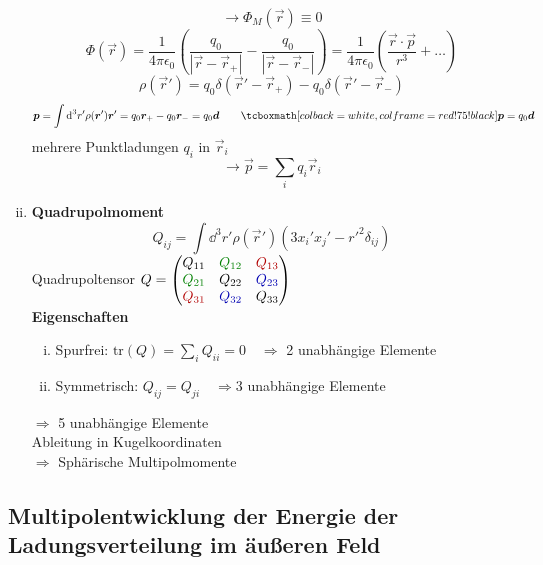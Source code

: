 \begin{enumerate}[i)]
\begin{minipage}{.5\linewidth}
\begin{tikzpicture}
		\end{tikzpicture}
	\end{minipage}%
	\[\rightarrow\Phi_M(\vec{r})\equiv0\]
	\[\Phi(\vec{r})=\frac{1}{4\pi\epsilon_0}\left(\frac{q_0}{|\vec{r}-\vec{r}_+|}-\frac{q_0}{|\vec{r}-\vec{r}_-|}\right)=\frac{1}{4\pi\epsilon_0}\left(\frac{\vec{r}\cdot\vec{p}}{r^3}+\ldots\right)\]
	\[\rho(\vec{r}')=q_0\delta(\vec{r}'-\vec{r}_+)-q_0\delta(\vec{r}'-\vec{r}_-)\]
	\[\vec{p}=\int\dd^3r'\rho(\vec{r}')\vec{r}'=q_0\vec{r}_+-q_0\vec{r}_-=q_0\vec{d} \qquad \rmbox{\vec{p} = q_0 \vec{d}}\]
	mehrere Punktladungen $q_i$ in $\vec{r}_i$\\
	\[\rightarrow\vec{p}=\sum_iq_i\vec{r}_i\]
	\item \textbf{Quadrupolmoment}
	\[Q_{ij}=\int\dd^3r'\rho(\vec{r}')(3x_i'x_j'-r'^2\delta_{ij})\]
	Quadrupoltensor $Q=\begin{pmatrix}Q_{11}& \color{black!50!green} Q_{12}& \color{black!30!red} Q_{13}\\\color{black!50!green} Q_{21} &Q_{22}& \color{black!30!blue} Q_{23}\\\color{black!30!red} Q_{31} & \color{black!30!blue} Q_{32} & Q_{33}\end{pmatrix}$\\ 
	\textbf{Eigenschaften}
	\begin{enumerate}[i)]
		\item Spurfrei: $\mathrm{tr}(Q)=\sum_iQ_{ii}=0 \quad \Rightarrow $ 2 unabhängige Elemente
		\item Symmetrisch: $Q_{ij}=Q_{ji} \quad \Rightarrow 3 $ unabhängige Elemente
	\end{enumerate}
	$\Rightarrow$ 5 unabhängige Elemente\\[5pt]
	
	Ableitung in Kugelkoordinaten\\
	$\Rightarrow$ Sphärische Multipolmomente
\end{enumerate}

\subsection{Multipolentwicklung der Energie der Ladungsverteilung im äußeren Feld}

